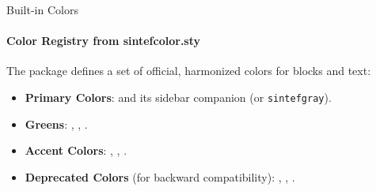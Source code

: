 \footlinecolor{}
\begin{frame}[fragile]{Built-in Colors}
\framesubtitle{Color Registry from sintefcolor.sty}
The package defines a set of official, harmonized colors for blocks and text:
\begin{itemize}
    \item \textbf{Primary Colors}:
     and its sidebar companion  (or \texttt{sintefgray}).
    \item \textbf{Greens}:
    , , .
    \item \textbf{Accent Colors}:
    , , .
    \item \textbf{Deprecated Colors} (for backward compatibility):
    , , .
\end{itemize}
\end{frame}
